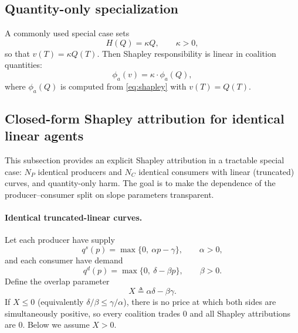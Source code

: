 \documentclass[journal, a4paper]{IEEEtran}
\begin{document}
\subsection{Quantity-only specialization}
A commonly used special case sets
\begin{equation}
H(Q)=\kappa Q,\qquad \kappa>0,
\label{eq:linearharm}
\end{equation}
so that $v(T)=\kappa Q(T)$. Then Shapley responsibility is linear in coalition quantities:
\begin{equation}
\phi_a(v)=\kappa\cdot \phi_a(Q),
\end{equation}
where $\phi_a(Q)$ is computed from \eqref{eq:shapley} with $v(T)=Q(T)$.


\subsection{Closed-form Shapley attribution for identical linear agents}
\label{sec:shapley_linear_identical}
This subsection provides an explicit Shapley attribution in a tractable special case: $N_P$ identical producers and $N_C$ identical consumers with linear (truncated) curves, and quantity-only harm. The goal is to make the dependence of the producer--consumer split on slope parameters transparent.

\paragraph{Identical truncated-linear curves.}
Let each producer have supply
\begin{equation}
q^s(p)=\max\{0,\ \alpha p-\gamma\},\qquad \alpha>0,
\label{eq:lin_supply}
\end{equation}
and each consumer have demand
\begin{equation}
q^d(p)=\max\{0,\ \delta-\beta p\},\qquad \beta>0.
\label{eq:lin_demand}
\end{equation}
Define the overlap parameter
\begin{equation}
X \triangleq \alpha\delta-\beta\gamma.
\label{eq:X_def}
\end{equation}
If $X\le 0$ (equivalently $\delta/\beta\le \gamma/\alpha$), there is no price at which both sides are simultaneously positive, so every coalition trades $0$ and all Shapley attributions are $0$. Below we assume $X>0$.
\end{document}
